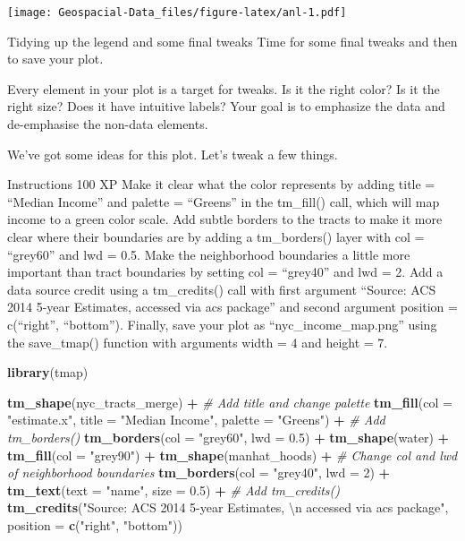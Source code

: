 \documentclass[]{article}
\newenvironment{Shaded}{\begin{snugshade}}{\end{snugshade}}
\newcommand{\CharTok}[1]{\textcolor[rgb]{0.31,0.60,0.02}{#1}}
\newcommand{\CommentTok}[1]{\textcolor[rgb]{0.56,0.35,0.01}{\textit{#1}}}
\newcommand{\DataTypeTok}[1]{\textcolor[rgb]{0.13,0.29,0.53}{#1}}
\newcommand{\DecValTok}[1]{\textcolor[rgb]{0.00,0.00,0.81}{#1}}
\newcommand{\FloatTok}[1]{\textcolor[rgb]{0.00,0.00,0.81}{#1}}
\newcommand{\KeywordTok}[1]{\textcolor[rgb]{0.13,0.29,0.53}{\textbf{#1}}}
\newcommand{\NormalTok}[1]{#1}
\newcommand{\OperatorTok}[1]{\textcolor[rgb]{0.81,0.36,0.00}{\textbf{#1}}}
\newcommand{\StringTok}[1]{\textcolor[rgb]{0.31,0.60,0.02}{#1}}
\begin{document}
\texttt{[image: Geospacial-Data\_files/figure-latex/anl-1.pdf]}

Tidying up the legend and some final tweaks Time for some final tweaks
and then to save your plot.

Every element in your plot is a target for tweaks. Is it the right
color? Is it the right size? Does it have intuitive labels? Your goal is
to emphasize the data and de-emphasise the non-data elements.

We've got some ideas for this plot. Let's tweak a few things.

Instructions 100 XP Make it clear what the color represents by adding
title = ``Median Income'' and palette = ``Greens'' in the tm\_fill()
call, which will map income to a green color scale. Add subtle borders
to the tracts to make it more clear where their boundaries are by adding
a tm\_borders() layer with col = ``grey60'' and lwd = 0.5. Make the
neighborhood boundaries a little more important than tract boundaries by
setting col = ``grey40'' and lwd = 2. Add a data source credit using a
tm\_credits() call with first argument ``Source: ACS 2014 5-year
Estimates, \n accessed via acs package'' and second argument position =
c(``right'', ``bottom''). Finally, save your plot as
``nyc\_income\_map.png'' using the save\_tmap() function with arguments
width = 4 and height = 7.

\begin{Shaded}
\begin{Highlighting}[]
\KeywordTok{library}\NormalTok{(tmap)}

\KeywordTok{tm_shape}\NormalTok{(nyc_tracts_merge) }\OperatorTok{+}
\StringTok{  }\CommentTok{# Add title and change palette}
\StringTok{  }\KeywordTok{tm_fill}\NormalTok{(}\DataTypeTok{col =} \StringTok{"estimate.x"}\NormalTok{, }
          \DataTypeTok{title =} \StringTok{"Median Income"}\NormalTok{,}
          \DataTypeTok{palette =} \StringTok{"Greens"}\NormalTok{) }\OperatorTok{+}
\StringTok{  }\CommentTok{# Add tm_borders()}
\StringTok{  }\KeywordTok{tm_borders}\NormalTok{(}\DataTypeTok{col =} \StringTok{"grey60"}\NormalTok{, }\DataTypeTok{lwd =} \FloatTok{0.5}\NormalTok{) }\OperatorTok{+}
\StringTok{  }\KeywordTok{tm_shape}\NormalTok{(water) }\OperatorTok{+}
\StringTok{  }\KeywordTok{tm_fill}\NormalTok{(}\DataTypeTok{col =} \StringTok{"grey90"}\NormalTok{) }\OperatorTok{+}
\StringTok{  }\KeywordTok{tm_shape}\NormalTok{(manhat_hoods) }\OperatorTok{+}
\StringTok{  }\CommentTok{# Change col and lwd of neighborhood boundaries}
\StringTok{  }\KeywordTok{tm_borders}\NormalTok{(}\DataTypeTok{col =} \StringTok{"grey40"}\NormalTok{, }\DataTypeTok{lwd =} \DecValTok{2}\NormalTok{) }\OperatorTok{+}
\StringTok{  }\KeywordTok{tm_text}\NormalTok{(}\DataTypeTok{text =} \StringTok{"name"}\NormalTok{, }\DataTypeTok{size =} \FloatTok{0.5}\NormalTok{) }\OperatorTok{+}
\StringTok{  }\CommentTok{# Add tm_credits()}
\StringTok{  }\KeywordTok{tm_credits}\NormalTok{(}\StringTok{"Source: ACS 2014 5-year Estimates, }\CharTok{\textbackslash{}n}\StringTok{ accessed via acs package"}\NormalTok{, }
             \DataTypeTok{position =} \KeywordTok{c}\NormalTok{(}\StringTok{"right"}\NormalTok{, }\StringTok{"bottom"}\NormalTok{))}
\end{Highlighting}
\end{Shaded}
\end{document}
